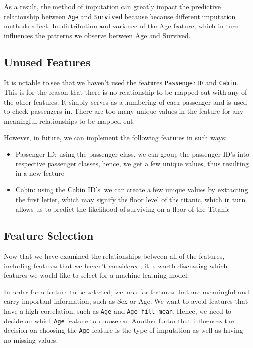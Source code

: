 \documentclass[a4paper, twocolumn]{article}
\begin{document}
As a result, the method of imputation can greatly impact the predictive relationship between \texttt{Age} and 
\texttt{Survived} because because different imputation methods affect the distribution and variance of the Age 
feature, which in turn influences the patterns we observe between Age and Survived.

\subsection{Unused Features}
It is notable to see that we haven't used the features \texttt{PassengerID} and \texttt{Cabin}. This is for the
reason that there is no relationship to be mapped out with any of the other features. It simply serves as a numbering
of each passenger and is used to check passengers in. There are too many unique values in the feature for any 
meaningful relationships to be mapped out.

However, in future, we can implement the following features in such ways:
\begin{itemize}
    \item Passenger ID: using the passenger class, we can group the passenger ID's into respective passenger classes,
    hence, we get a few unique values, thus resulting in a new feature
    \item Cabin: using the Cabin ID's, we can create a few unique values by extracting the first letter, which 
    may signify the floor level of the titanic, which in turn allows us to predict the likelihood of surviving
    on a floor of the Titanic
\end{itemize}

\subsection{Feature Selection}
Now that we have examined the relationships between all of the features, including features that we haven't
considered, it is worth discussing which features we would like to select for a machine learning model.

In order for a feature to be selected, we look for features that are meaningful and carry important information, 
such as Sex or Age. We want to avoid features that have a high correlation, such as \texttt{Age} and 
\texttt{Age\_fill\_mean}. Hence, we need to decide on which \texttt{Age} feature to choose on. Another factor that
influences the decision on choosing the \texttt{Age} feature is the type of imputation as well as having no 
missing values. 
\end{document}
